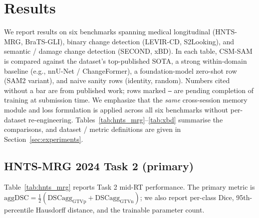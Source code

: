 \section{Results}
\label{sec:results}

We report results on six benchmarks spanning medical longitudinal
(HNTS-MRG, BraTS-GLI), binary change detection (LEVIR-CD, S2Looking),
and semantic / damage change detection (SECOND, xBD). In each table,
CSM-SAM is compared against the dataset's top-published SOTA, a strong
within-domain baseline (e.g., nnU-Net / ChangeFormer), a
foundation-model zero-shot row (SAM2 variant), and naive sanity rows
(identity, random). Numbers cited without a bar are from published
work; rows marked \texttt{--} are pending completion of training at
submission time. We emphasize that the \emph{same} cross-session memory
module and loss formulation is applied across all six benchmarks
without per-dataset re-engineering. Tables~\ref{tab:hnts_mrg}--\ref{tab:xbd}
summarise the comparisons, and dataset / metric definitions are given
in Section~\ref{sec:experiments}.

\subsection{HNTS-MRG 2024 Task 2 (primary)}
\label{sec:results_hnts}

Table~\ref{tab:hnts_mrg} reports Task 2 mid-RT performance. The primary
metric is \(\mathrm{aggDSC} = \tfrac{1}{2}(\mathrm{DSCagg}_{\mathrm{GTVp}}
+ \mathrm{DSCagg}_{\mathrm{GTVn}})\); we also report per-class Dice,
95th-percentile Hausdorff distance, and the trainable parameter count.



